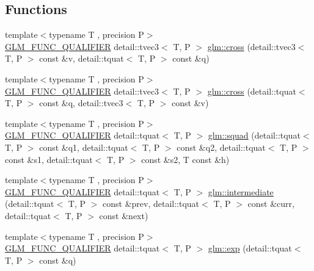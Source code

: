 \subsection*{Functions}
\begin{DoxyCompactItemize}
\item 
{\footnotesize template$<$typename T , precision P$>$ }\\\hyperlink{setup_8hpp_a33fdea6f91c5f834105f7415e2a64407}{G\+L\+M\+\_\+\+F\+U\+N\+C\+\_\+\+Q\+U\+A\+L\+I\+F\+I\+ER} detail\+::tvec3$<$ T, P $>$ \hyperlink{group__gtx__quaternion_ga7794f940ba271ff846ea706204b0259a}{glm\+::cross} (detail\+::tvec3$<$ T, P $>$ const \&v, detail\+::tquat$<$ T, P $>$ const \&q)
\item 
{\footnotesize template$<$typename T , precision P$>$ }\\\hyperlink{setup_8hpp_a33fdea6f91c5f834105f7415e2a64407}{G\+L\+M\+\_\+\+F\+U\+N\+C\+\_\+\+Q\+U\+A\+L\+I\+F\+I\+ER} detail\+::tvec3$<$ T, P $>$ \hyperlink{group__gtx__quaternion_ga8b5c3ff869c773f26d0a562dfcd3f9e4}{glm\+::cross} (detail\+::tquat$<$ T, P $>$ const \&q, detail\+::tvec3$<$ T, P $>$ const \&v)
\item 
{\footnotesize template$<$typename T , precision P$>$ }\\\hyperlink{setup_8hpp_a33fdea6f91c5f834105f7415e2a64407}{G\+L\+M\+\_\+\+F\+U\+N\+C\+\_\+\+Q\+U\+A\+L\+I\+F\+I\+ER} detail\+::tquat$<$ T, P $>$ \hyperlink{group__gtx__quaternion_ga5e756a5817856a3d69f0974fac8322e2}{glm\+::squad} (detail\+::tquat$<$ T, P $>$ const \&q1, detail\+::tquat$<$ T, P $>$ const \&q2, detail\+::tquat$<$ T, P $>$ const \&s1, detail\+::tquat$<$ T, P $>$ const \&s2, T const \&h)
\item 
{\footnotesize template$<$typename T , precision P$>$ }\\\hyperlink{setup_8hpp_a33fdea6f91c5f834105f7415e2a64407}{G\+L\+M\+\_\+\+F\+U\+N\+C\+\_\+\+Q\+U\+A\+L\+I\+F\+I\+ER} detail\+::tquat$<$ T, P $>$ \hyperlink{group__gtx__quaternion_ga96cb50103d939ea50d8b80bc898b2a35}{glm\+::intermediate} (detail\+::tquat$<$ T, P $>$ const \&prev, detail\+::tquat$<$ T, P $>$ const \&curr, detail\+::tquat$<$ T, P $>$ const \&next)
\item 
{\footnotesize template$<$typename T , precision P$>$ }\\\hyperlink{setup_8hpp_a33fdea6f91c5f834105f7415e2a64407}{G\+L\+M\+\_\+\+F\+U\+N\+C\+\_\+\+Q\+U\+A\+L\+I\+F\+I\+ER} detail\+::tquat$<$ T, P $>$ \hyperlink{group__gtx__quaternion_gaadebfad5c8b4b3dde114915f0494b739}{glm\+::exp} (detail\+::tquat$<$ T, P $>$ const \&q)

\end{DoxyCompactItemize}
